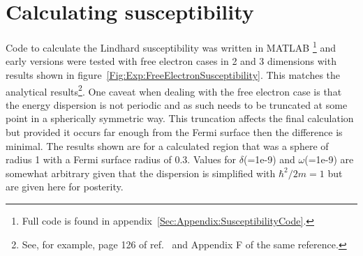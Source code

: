 \section{Calculating susceptibility}
    \label{Sec:Exp:Susceptibility}

Code to calculate the Lindhard susceptibility was written in MATLAB \footnote{Full code is found in appendix~\ref{Sec:Appendix:SusceptibilityCode}.} and early versions were tested with free electron cases in 2 and 3 dimensions with results shown in figure~\ref{Fig:Exp:FreeElectronSusceptibility}. This matches the analytical results\footnote{See, for example, page 126 of ref.~\cite{Dressel2002} and Appendix F of the same reference.}. One caveat when dealing with the free electron case is that the energy dispersion is not periodic and as such needs to be truncated at some point in a spherically symmetric way. This truncation affects the final calculation but provided it occurs far enough from the Fermi surface then the difference is minimal. The results shown are for a calculated region that was a sphere of radius 1 with a Fermi surface radius of 0.3. Values for $\delta$(=1e-9) and $\omega$(=1e-9) are somewhat arbitrary given that the dispersion is simplified with $\hbar^2/2m = 1$ but are given here for posterity. 

